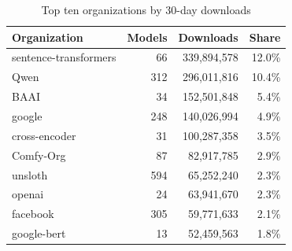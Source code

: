 \begin{table}[t]
\caption{Top ten organizations by 30-day downloads}
\label{tab:toporgs}
\centering
\small
\begin{tabular}{lrrr}
\toprule
Organization & Models & Downloads & Share \\
\midrule
sentence-transformers & 66 & 339,894,578 & 12.0\% \\
Qwen & 312 & 296,011,816 & 10.4\% \\
BAAI & 34 & 152,501,848 & 5.4\% \\
google & 248 & 140,026,994 & 4.9\% \\
cross-encoder & 31 & 100,287,358 & 3.5\% \\
Comfy-Org & 87 & 82,917,785 & 2.9\% \\
unsloth & 594 & 65,252,240 & 2.3\% \\
openai & 24 & 63,941,670 & 2.3\% \\
facebook & 305 & 59,771,633 & 2.1\% \\
google-bert & 13 & 52,459,563 & 1.8\% \\
\bottomrule
\end{tabular}
\normalsize
\end{table}
